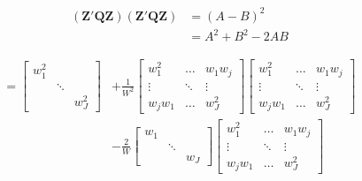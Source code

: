 \begin{equation}
\begin{split}
    (\mathbf{Z}'\mathbf{Q}\mathbf{Z})(\mathbf{Z}'\mathbf{Q}\mathbf{Z}) & = (A-B)^2 \\
     & = A^2 + B^2 - 2AB
\end{split}
     \nonumber
\end{equation}

\begin{equation}
\begin{split}
     =\begin{bmatrix}
        w_1^2 & &   \\
         &  \ddots &  \\
         & &   w_J^2
    \end{bmatrix}  & + \frac{1}{W^2}
    \begin{bmatrix}
         w_1^2 & \dots & w_1w_j  \\
         \vdots & \ddots & \vdots \\
         w_jw_1 & \dots &  w_J^2
    \end{bmatrix} 
     \begin{bmatrix}
         w_1^2 & \dots & w_1w_j  \\
         \vdots & \ddots & \vdots \\
         w_jw_1 & \dots &  w_J^2
    \end{bmatrix} \\ &- 
    \frac{2}{W} \begin{bmatrix}
        w_1 & &   \\
         &  \ddots &  \\
         & &   w_J
    \end{bmatrix}  \begin{bmatrix}
         w_1^2 & \dots & w_1w_j  \\
         \vdots & \ddots & \vdots \\
         w_jw_1 & \dots &  w_J^2
    \end{bmatrix}
\end{split}
    \nonumber
\end{equation}

